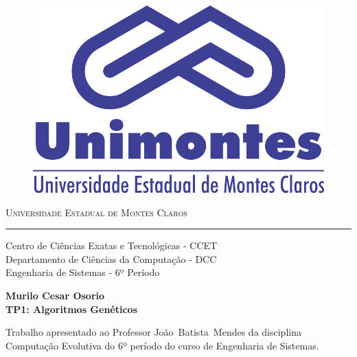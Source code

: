 \documentclass[11pt,a4paper]{article}
\author{Murilo Camargos}
\begin{document}
\begin{minipage}[t]{.3\textwidth}
\vspace{-20pt}
\begin{figure}[H]
\includegraphics[scale=0.5]{unimontes.png}
\end{figure}
\end{minipage}%
\begin{minipage}[t]{.7\textwidth}
\textsc{\large Universidade Estadual de Montes Claros}
\vspace{0.25cm}\hrule\vspace{0.25cm}
Centro de Ciências Exatas e Tecnológicas - CCET\\[0.08cm]
Departamento de Ciências da Computação - DCC\\[0.08cm]
Engenharia de Sistemas - 6º Período
\end{minipage}

\vspace*{\fill}
\begin{center}
\bf
Murilo Cesar Osorio\\
\vspace*{\fill}
\Huge
TP1: Algoritmos Genéticos
\end{center}
\vspace*{\fill}
\begin{minipage}[t]{.6\textwidth}
\hspace{1pt}
\end{minipage}%
\begin{minipage}[t]{.4\textwidth}
Trabalho apresentado ao Professor \mbox{João Batista Mendes} da disciplina Computação Evolutiva do 6º período do curso de Engenharia de Sistemas.
\end{minipage}
\end{document}
